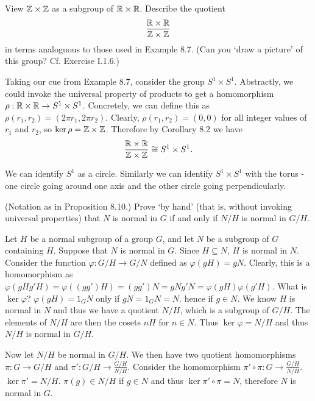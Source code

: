 \begin{problem}
	View $\mathbb{Z} \times \mathbb{Z}$ as a subgroup of $\mathbb{R} \times \mathbb{R}$. Describe the quotient
	\[
		\frac{\mathbb{R} \times \mathbb{R}}{\mathbb{Z} \times \mathbb{Z}}
	\]
	in terms analoguous to those used in Example 8.7. (Can you `draw a picture' of this group? Cf. Exercise I.1.6.)
\end{problem}

\begin{solution}
	Taking our cue from Example 8.7, consider the group $S^1 \times S^1$. Abstractly, we could invoke the universal property of products to get a homomorphism $\rho: \mathbb{R} \times \mathbb{R} \to S^1 \times S^1$. Concretely, we can define this as $\rho(r_1, r_2) = (2 \pi r_1, 2 \pi r_2)$. Clearly, $\rho(r_1, r_2) = (0, 0)$ for all integer values of $r_1$ and $r_2$, so $\ker \rho = \mathbb{Z} \times \mathbb{Z}$. Therefore by Corollary 8.2 we have
	\[
		\frac{\mathbb{R} \times \mathbb{R}}{\mathbb{Z} \times \mathbb{Z}} \cong S^1 \times S^1 \text{.}
	\]
	
	We can identify $S^1$ as a circle. Similarly we can identify $S^1 \times S^1$ with the torus - one circle going around one axis and the other circle going perpendicularly.
\end{solution}

\begin{problem}
	(Notation as in Proposition 8.10.) Prove `by hand' (that is, without invoking universal properties) that $N$ is normal in $G$ if and only if $N/H$ is normal in $G/H$.
\end{problem}

\begin{solution}
	Let $H$ be a normal subgroup of a group $G$, and let $N$ be a subgroup of $G$ containing $H$. Suppose that $N$ is normal in $G$. Since $H \subseteq N$, $H$ is normal in $N$. Consider the function $\varphi: G/H \to G/N$ defined as $\varphi(gH) = gN$. Clearly, this is a homomorphism as $\varphi(gH g'H) = \varphi((gg')H) = (gg')N = gN g'N = \varphi(gH) \varphi(g'H)$. What is $\ker \varphi$? $\varphi(gH) = 1_G N$ only if $gN = 1_G N = N$. hence if $g \in N$. We know $H$ is normal in $N$ and thus we have a quotient $N/H$, which is a subgroup of $G/H$. The elements of $N/H$ are then the cosets $nH$ for $n \in N$. Thus $\ker \varphi = N/H$ and thus $N/H$ is normal in $G/H$.
	
	Now let $N/H$ be normal in $G/H$. We then have two quotient homomorphisms $\pi: G \to G/H$ and $\pi': G/H \to \frac{G/H}{N/H}$. Consider the homomorphism $\pi' \circ \pi: G \to \frac{G/H}{N/H}$. $\ker \pi' = N/H$. $\pi(g) \in N/H$ if $g \in N$ and thus $\ker \pi' \circ \pi = N$, therefore $N$ is normal in $G$.
\end{solution}


